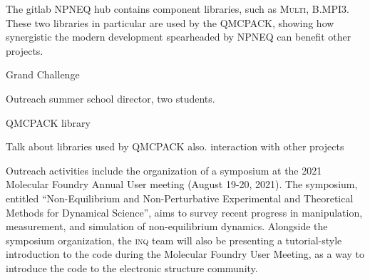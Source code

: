 The gitlab NPNEQ hub contains component libraries, such as \textsc{Multi}, \textsc{B.MPI3}.
These two libraries in particular are used by the QMCPACK, showing how synergistic the modern development spearheaded by NPNEQ can benefit other projects.

Grand Challenge 

Outreach summer school director, two students.

QMCPACK library




Talk about libraries used by QMCPACK also. interaction with other projects


Outreach activities include the organization of a symposium at the 2021 Molecular Foundry Annual User meeting (August 19-20, 2021). 
The symposium, entitled ``Non-Equilibrium and Non-Perturbative Experimental and Theoretical Methods for Dynamical Science'', aims to survey recent progress in manipulation, measurement, and simulation of non-equilibrium dynamics.
Alongside the symposium organization, the \textsc{inq} team will also be presenting a tutorial-style introduction to the code during the Molecular Foundry User Meeting, as a way to introduce the code to the electronic structure community.

\clearpage


